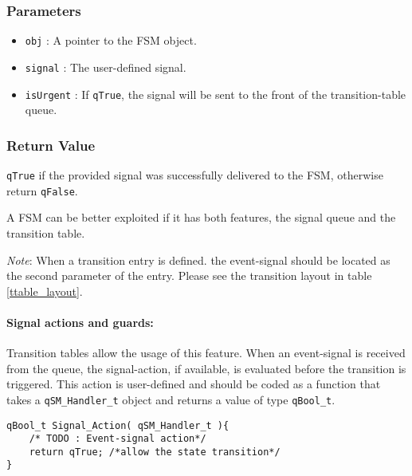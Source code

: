 \subsubsection*{Parameters}
\begin{itemize}
    \item \lstinline{obj} : A pointer to the FSM object. 
    \item \lstinline{signal} : The user-defined signal.
    \item \lstinline{isUrgent} : If \lstinline{qTrue}, the signal will be sent to the front of the transition-table queue.
\end{itemize}

\subsubsection*{Return Value}
\lstinline{qTrue} if the provided signal was successfully delivered to the FSM, otherwise return \lstinline{qFalse}.

\hrulefill
\newline

\begin{tcolorbox}
\HandRight A FSM can be better exploited if it has both features, the signal queue and the transition table.
\end{tcolorbox}

\begin{tcolorbox}
\ArrowBoldDownRight \textit{Note}: When a transition entry is defined. the event-signal should be located as the second parameter of the entry. Please see the transition layout in table \ref{ttable_layout}.
\end{tcolorbox}

\paragraph{Signal actions and guards:} Transition tables allow the usage of this feature. When an event-signal is received from the queue, the signal-action, if available, is evaluated before the transition is triggered. This action is user-defined and should be coded as a function that takes a \lstinline{qSM_Handler_t} object and returns a value of type \lstinline{qBool_t}. \\

\begin{lstlisting}[style=CStyle]
qBool_t Signal_Action( qSM_Handler_t ){
    /* TODO : Event-signal action*/
    return qTrue; /*allow the state transition*/
}
\end{lstlisting}

